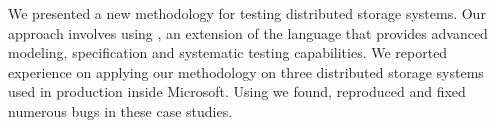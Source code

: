 We presented a new methodology for testing distributed storage systems. Our approach involves using \psharp, an extension of the \csharp language that provides advanced modeling, specification and systematic testing capabilities. We reported experience on applying our methodology on three distributed storage systems used in production inside Microsoft. Using \psharp we found, reproduced and fixed numerous bugs in these case studies.